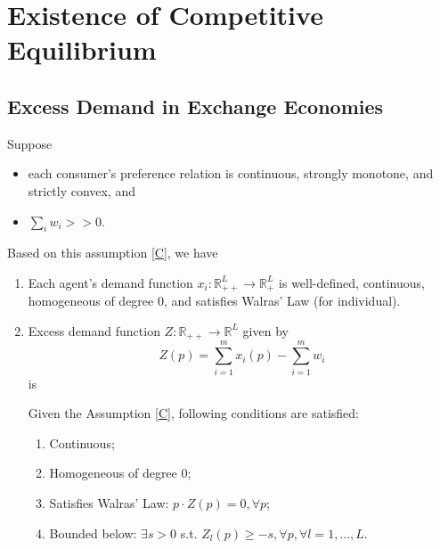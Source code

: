 \documentclass[11pt]{elegantbook}
\begin{document}
\section{Existence of Competitive Equilibrium}
\subsection{Excess Demand in Exchange Economies}
\begin{assumption}\label{C}
    Suppose
    \begin{itemize}
        \item each consumer's preference relation is continuous, strongly monotone, and strictly convex, and
        \item $\sum_{i}w_i>>0$.
    \end{itemize}
\end{assumption}
Based on this assumption \ref{C}, we have
\begin{enumerate}[$\circ$]
    \item Each agent's demand function $x_i:\mathbb{R}^L_{++} \rightarrow \mathbb{R}^L_+$ is well-defined, continuous, homogeneous of degree $0$, and satisfies Walras' Law (for individual).
    \item Excess demand function $Z:\mathbb{R}_{++} \rightarrow \mathbb{R}^L$ given by $$Z(p)=\sum_{i=1}^m x_i(p)-\sum_{i=1}^m w_i$$ is
    \begin{definition}[Condition (1) to (4)]
        \normalfont
        Given the Assumption \ref{C}, following conditions are satisfied:
        \begin{enumerate}[(1).]
            \item Continuous;
            \item Homogeneous of degree $0$;
            \item Satisfies Walras' Law: $p\cdot Z(p)=0, \forall p$;
            \item Bounded below: $\exists s>0$ s.t. $Z_l(p)\geq -s, \forall p, \forall l=1,...,L$.
        \end{enumerate}
    \end{definition}
\end{enumerate}
\end{document}
